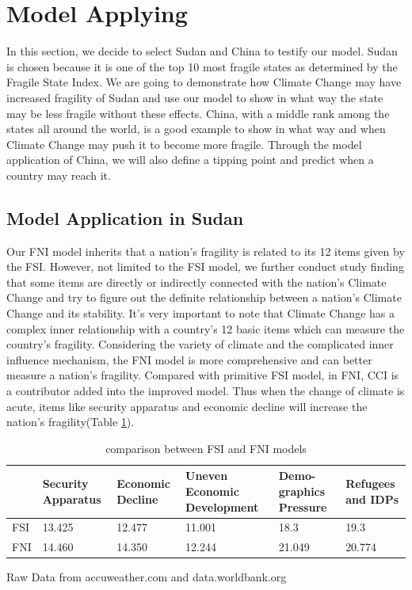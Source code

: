 \documentclass[a4paper,12pt]{article}
\begin{document}
\section{Model Applying}
In this section, we decide to select Sudan and China to testify our model. Sudan is chosen because it is one of the top 10 most fragile states as determined by the Fragile State Index. We are going to demonstrate how Climate Change may have increased fragility of Sudan and use our model to show in what way the state may be less fragile without these effects. China, with a middle rank among the states all around the world, is a good example to show in what way and when Climate Change may push it to become more fragile. Through the model application of China, we will also define a tipping point and predict when a country may reach it.
\subsection{Model Application in Sudan}
Our FNI model inherits that a nation's fragility is related to its 12 items given by the FSI. However, not limited to the FSI model, we further conduct study finding that some items are directly or indirectly connected with the nation's Climate Change and try to figure out the definite relationship between a nation's Climate Change and its stability. It's very important to note that Climate Change has a complex inner relationship with a country's 12 basic items which can measure the country's fragility. Considering the variety of climate and the complicated inner influence mechanism, the FNI model is more comprehensive and can better measure a nation's fragility.
Compared with primitive FSI model, in FNI, CCI is a contributor added into the improved model. Thus when the change of climate is acute, items like security apparatus and economic decline will increase the nation's fragility(Table \ref{tab1}).
\begin{table}[h]
  \caption{comparison between FSI and FNI models}
  \label{tab1}
  \centering
  \begin{tabular}{lp{2.1cm}p{2.1cm}p{2.1cm}p{2.1cm}p{2.1cm}}
  \toprule
   &\textbf{Security Apparatus} &\textbf{Economic Decline}&\textbf{Uneven Economic Development}&\textbf{Demo-graphics Pressure}&\textbf{Refugees and IDPs}\\
  \midrule
  FSI & 13.425	&12.477	&11.001	&18.3	&19.3\\
 FNI &	14.460	&14.350	&12.244	&21.049	&20.774\\ 
  \bottomrule
  \end{tabular}
  \begin{tablenotes}
    \item
     \begin{flushright}
       Raw Data from accuweather.com and data.worldbank.org
     \end{flushright}
  \end{tablenotes}
\end{table}
\end{document}
